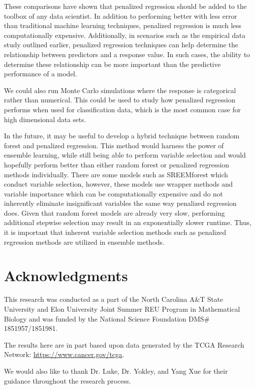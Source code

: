 \documentclass{article}
\begin{document}
	These comparisons have shown that penalized regression should be added to the toolbox of any data scientist. In addition to performing better with less error than traditional machine learning techniques, penalized regression is much less computationally expensive. Additionally, in scenarios such as the empirical data study outlined earlier, penalized regression techniques can help determine the relationship between predictors and a response value. In such cases, the ability to determine these relationship can be more important than the predictive performance of a model.
	
	We could also run Monte Carlo simulations where the response is categorical rather than numerical. This could be used to study how penalized regression performs when used for classification data, which is the most common case for high dimensional data sets.
	
	In the future, it may be useful to develop a hybrid technique between random forest and penalized regression. This method would harness the power of ensemble learning, while still being able to perform variable selection and would hopefully perform better than either random forest or penalized regression methods individually. There are some models such as SREEMforest \cite{capitaine2021random} which conduct variable selection, however, these models use wrapper methods and variable importance which can be computationally expensive and do not inherently eliminate insignificant variables the same way penalized regression does. Given that random forest models are already very slow, performing additional stepwise selection may result in an exponentially slower runtime. Thus, it is important that inherent variable selection methods such as penalized regression methods are utilized in ensemble methods.
	
	\section{Acknowledgments}
	
	This research was conducted as a part of the North Carolina A\&T State University and Elon University Joint Summer REU Program in Mathematical Biology and was funded by the National Science Foundation DMS\# 1851957/1851981.
	
	The results here are in part based upon data generated by the TCGA Research Network: \href{https://www.cancer.gov/tcga}{https://www.cancer.gov/tcga}.
	
	We would also like to thank Dr. Luke, Dr. Yokley, and Yang Xue for their guidance throughout the research process.
	
\end{document}
